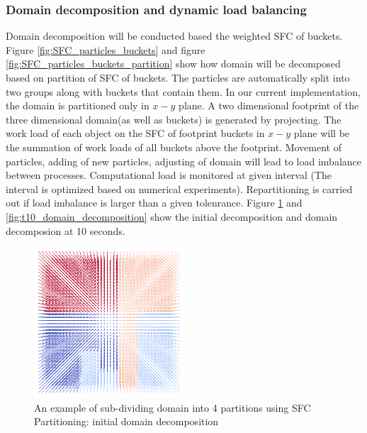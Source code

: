 \documentclass[10pt,a4paper]{article}
\begin{document}
\subsubsection{Domain decomposition and dynamic load balancing}
Domain decomposition will be conducted based the weighted SFC of buckets. Figure \ref{fig:SFC_particles_buckets} and figure \ref{fig:SFC_particles_buckets_partition} show how domain will be decomposed based on partition of SFC of buckets. The particles are automatically split into two groups along with buckets that contain them. In our current implementation, the domain is partitioned only in $x-y$ plane. A two dimensional footprint of the three dimensional domain(as well as buckets) is generated by projecting. 
The work load of each object on the SFC of footprint buckets in $x-y$ plane will be the summation of work loads of all buckets above the footprint. 
Movement of particles, adding of new particles, adjusting of domain will lead to load imbalance between processes. Computational load is monitored at given interval (The interval is optimized based on numerical experiments). Repartitioning is carried out if load imbalance is larger than a given tolenrance. Figure \ref{fig:t0_domain_decomposition} and \ref{fig:t10_domain_decomposition} show the initial decomposition and domain decomposion at 10 seconds. 
\begin{figure}[h]
\caption{An example of sub-dividing domain into 4 partitions using SFC Partitioning: initial domain decomposition}
\centering
\label{fig:t0_domain_decomposition}
\includegraphics[width=0.5\textwidth]{t0_domain_decomposition}
\end{figure}
\end{document}
